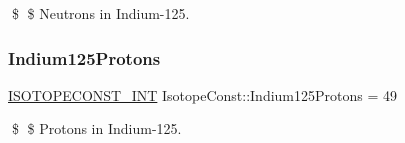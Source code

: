 \$ \$ Neutrons in Indium-\/125. \mbox{\label{group___isotope_const-_indium-_in125_gaaea9b035504cc085ca4f097700e0f44c}} 
\subsubsection{\texorpdfstring{Indium125\+Protons}{Indium125Protons}}
{\footnotesize\ttfamily \mbox{\hyperlink{group___isotope_const-_macros_ga5f18360b3e99483a35c32d789e62621c}{I\+S\+O\+T\+O\+P\+E\+C\+O\+N\+S\+T\+\_\+\+I\+NT}} Isotope\+Const\+::\+Indium125\+Protons = 49}

\$ \$ Protons in Indium-\/125. 